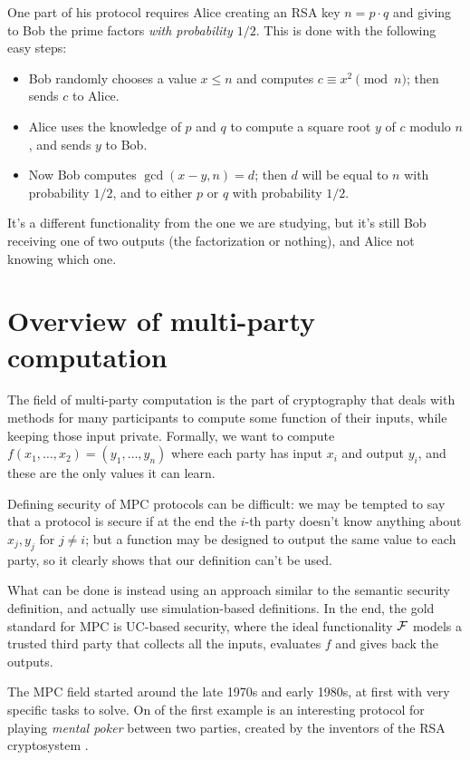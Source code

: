 One part of his protocol requires Alice creating an RSA key $n=p\cdot q$ and giving to Bob the prime factors \emph{with probability $1/2$}. This is done with the following easy steps:
\begin{itemize}
    \item Bob randomly chooses a value $x\le n$ and computes $c\equiv x^2\pmod n$; then sends $c$ to Alice.
    \item Alice uses the knowledge of $p$ and $q$ to compute a square root $y$ of $c$ modulo $n$, and sends $y$ to Bob.
    \item Now Bob computes $\gcd(x-y,n)=d$; then $d$ will be equal to $n$ with probability $1/2$, and to either $p$ or $q$ with probability $1/2$.
\end{itemize}

It's a different functionality from the one we are studying, but it's still Bob receiving one of two outputs (the factorization or nothing), and Alice not knowing which one.

\section{Overview of multi-party computation}

The field of multi-party computation is the part of cryptography that deals with methods for many participants to compute some function of their inputs, while keeping those input private. Formally, we want to compute $f(x_1,\dots,x_2)=(y_1,\dots,y_n)$ where each party has input $x_i$ and output $y_i$, and these are the only values it can learn.

Defining security of MPC protocols can be difficult: we may be tempted to say that a protocol is secure if at the end the $i$-th party doesn't know anything about $x_j,y_j$ for $j\neq i$; but a function may be designed to output the same value to each party, so it clearly shows that our definition can't be used.

What can be done is instead using an approach similar to the semantic security definition, and actually use simulation-based definitions. In the end, the gold standard for MPC is UC-based security, where the ideal functionality $\mathcal{F}$ models a trusted third party that collects all the inputs, evaluates $f$ and gives back the outputs.

The MPC field started around the late 1970s and early 1980s, at first with very specific tasks to solve. On of the first example is an interesting protocol for playing \emph{mental poker} between two parties, created by the inventors of the RSA cryptosystem \cite{poker}.

